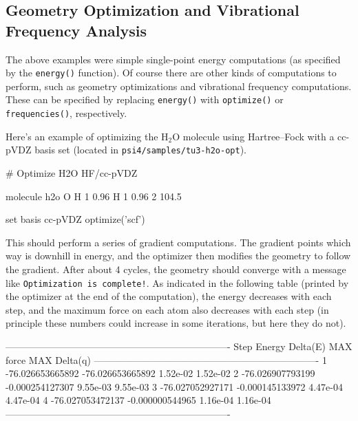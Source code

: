 \subsection{Geometry Optimization and Vibrational Frequency Analysis}
The above examples were simple single-point energy computations
(as specified by the {\tt energy()} function).  Of course there are other
kinds of computations to perform, such as geometry optimizations and
vibrational frequency computations.  These can be specified by replacing
{\tt energy()} with {\tt optimize()} or {\tt frequencies()}, respectively.

Here's an example of optimizing the H$_2$O molecule using Hartree--Fock with
a cc-pVDZ basis set (located in {\tt psi4/samples/tu3-h2o-opt}).
\begin{Snippet}
# Optimize H2O HF/cc-pVDZ

molecule h2o {
  O
  H 1 0.96
  H 1 0.96 2 104.5
}

set basis cc-pVDZ
optimize('scf')
\end{Snippet}

This should perform a series of gradient computations.  The gradient points
which way is downhill in energy, and the optimizer then modifies the
geometry to follow the gradient.  After about 4 cycles, the geometry should
converge with a message like {\tt Optimization is complete!}.  As indicated
in the following table (printed by the optimizer at the end of the
computation), the energy decreases with each step,
and the maximum force on each atom also decreases with each step (in
principle these numbers could increase in some iterations, but here they do
not).

\begin{Snippet}
----------------------------------------------------------------------
Step         Energy             Delta(E)      MAX force   MAX Delta(q)
----------------------------------------------------------------------
  1    -76.026653665892    -76.026653665892    1.52e-02   1.52e-02
  2    -76.026907793199     -0.000254127307    9.55e-03   9.55e-03
  3    -76.027052927171     -0.000145133972    4.47e-04   4.47e-04
  4    -76.027053472137     -0.000000544965    1.16e-04   1.16e-04
----------------------------------------------------------------------
\end{Snippet}

